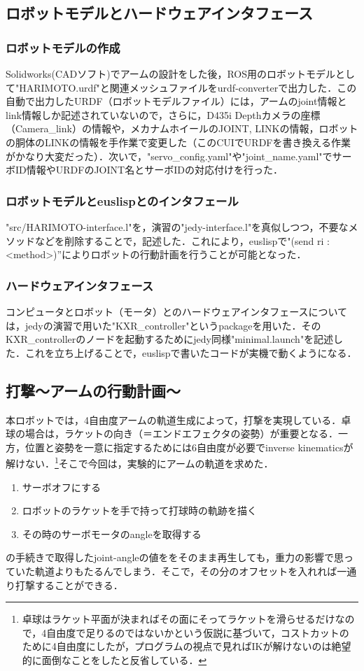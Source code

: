 \documentclass[10pt, oneside, titlepage]{ltjarticle}  %
\begin{document}
  \subsection{ロボットモデルとハードウェアインタフェース}
    \subsubsection{ロボットモデルの作成}
    Solidworks(CADソフト)でアームの設計をした後，ROS用のロボットモデルとして"HARIMOTO.urdf"と関連メッシュファイルをurdf-converterで出力した．この自動で出力したURDF（ロボットモデルファイル）には，アームのjoint情報とlink情報しか記述されていないので，さらに，D435i Depthカメラの座標（Camera\_link）の情報や，メカナムホイールのJOINT, LINKの情報，ロボットの胴体のLINKの情報を手作業で変更した（このCUIでURDFを書き換える作業がかなり大変だった）．次いで，"servo\_config.yaml"や"joint\_name.yaml"でサーボID情報やURDFのJOINT名とサーボIDの対応付けを行った．

    \subsubsection{ロボットモデルとeuslispとのインタフェール}
    "src/HARIMOTO-interface.l"を，演習の"jedy-interface.l"を真似しつつ，不要なメソッドなどを削除することで，記述した．これにより，euslispで"(send ri :<method>)”によりロボットの行動計画を行うことが可能となった．
    \subsubsection{ハードウェアインタフェース}
    コンピュータとロボット（モータ）とのハードウェアインタフェースについては，jedyの演習で用いた"KXR\_controller"というpackageを用いた．そのKXR\_controllerのノードを起動するためにjedy同様"minimal.launch"を記述した．これを立ち上げることで，euslispで書いたコードが実機で動くようになる．

    \subsection{打撃〜アームの行動計画〜}
    本ロボットでは，4自由度アームの軌道生成によって，打撃を実現している．卓球の場合は，ラケットの向き（＝エンドエフェクタの姿勢）が重要となる．一方，位置と姿勢を一意に指定するためには6自由度が必要でinverse kinematicsが解けない．\footnote{卓球はラケット平面が決まればその面にそってラケットを滑らせるだけなので，4自由度で足りるのではないかという仮説に基づいて，コストカットのために4自由度にしたが，プログラムの視点で見ればIKが解けないのは絶望的に面倒なことをしたと反省している．}そこで今回は，実験的にアームの軌道を求めた．
    \begin{enumerate}
      \item サーボオフにする
      \item ロボットのラケットを手で持って打球時の軌跡を描く
      \item その時のサーボモータのangleを取得する
    \end{enumerate}
    の手続きで取得したjoint-angleの値ををそのまま再生しても，重力の影響で思っていた軌道よりもたるんでしまう．そこで，その分のオフセットを入れれば一通り打撃することができる．
\end{document}
